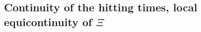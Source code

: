 \documentclass[11pt]{article}
\def\Conf{{\mathscr{R}}}
\begin{document}
\subsection{Continuity of the hitting times, local equicontinuity of \texorpdfstring{$\Xi$}{X}}
\end{document}
